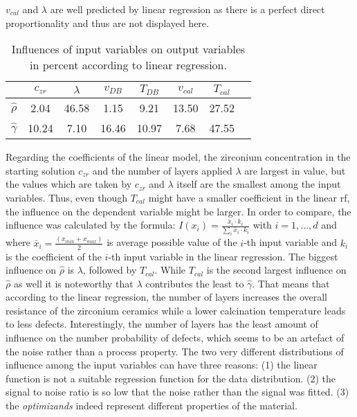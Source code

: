 $v_{cal}$ and $\lambda$ are well predicted by linear regression as there is a perfect direct proportionality and thus are not displayed here. 
%
\begin{table}[htb]
	\center
	\begin{tabular}{cccccccc}
		        & $c_{zr}$      & $\lambda$     & $v_{DB}$      & $T_{DB}$      & $v_{cal}$     & $T_{cal}$\\
				\hline\hline
				$\hat\rho$          &2.04   &46.58  &1.15   &9.21   &13.50  &27.52\\
				$\hat\gamma$        &10.24  &7.10   &16.46  &10.97  &7.68   &47.55\\
				\hline\hline
	\end{tabular}
	\label{tab:lin-reg-influence}
	\caption{Influences of input variables on output variables in percent according to linear regression.}
\end{table}

%
Regarding the coefficients of the linear model, the zirconium concentration in the starting solution $c_{zr}$ and the number of layers applied $\lambda$ are largest in value, but the values which are taken by $c_{zr}$ and $\lambda$ itself are the smallest among the input variables. 
Thus, even though $T_{cal}$ might have a smaller coefficient in the linear \gls{rf}, the influence on the dependent variable might be larger. 
In order to compare, the influence was calculated by the formula: $I(x_i)=\frac{\bar{x}_i \cdot k_i}{\sum_i \bar{x}_i \cdot k_i}$ with $i=1,\dots,d $ and where $\bar{x}_i= \frac{(x_{min}+x_{max})}{2}$ is average possible value of the $i$-th input variable and $k_i$ is the coefficient of the $i$-th input variable in the linear regression. 
The biggest influence on $\hat\rho$ is  $\lambda$, followed by $T_{cal}$. 
While $T_{cal}$ is the second largest influence on $\hat\rho$ as well it is noteworthy that $\lambda$ contributes the least to $\hat\gamma$. 
That means that according to the linear regression, the number of layers increases the overall resistance of the zirconium ceramics while a lower calcination temperature leads to less defects. 
Interestingly, the number of layers has the least amount of influence on the number probability of defects, which seems to be an artefact of the noise rather than a process property. 
The two very different distributions of influence among the input variables can have three reasons:
(1) the linear function is not a suitable regression function for the data distribution.
(2) the signal to noise ratio is so low that the noise rather than the signal was fitted.
(3) the \textit{optimizands} indeed represent different properties of the material.
%

